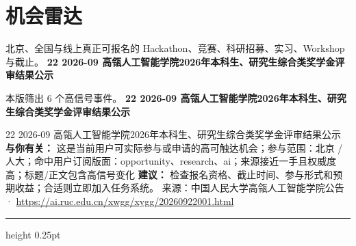 \documentclass[10.5pt]{ctexart}
\begin{document}
\section*{机会雷达}
{\color{ormuted} 北京、全国与线上真正可报名的 Hackathon、竞赛、科研招募、实习、Workshop 与截止。}
\vspace{2mm}
{\LARGE\bfseries 22 2026-09 高瓴人工智能学院2026年本科生、研究生综合类奖学金评审结果公示}\par
\vspace{1mm}
{\color{ormuted} 本版筛出 6 个高信号事件。}
\vspace{3mm}
{\Large\bfseries 22 2026-09 高瓴人工智能学院2026年本科生、研究生综合类奖学金评审结果公示}\par
22 2026-09 高瓴人工智能学院2026年本科生、研究生综合类奖学金评审结果公示
\textbf{与你有关：} 这是当前用户可实际参与或申请的高可触达机会；参与范围：北京 / 人大；命中用户订阅版面：opportunity、research、ai；来源接近一手且权威度高；标题/正文包含高信号变化
\textbf{建议：} 检查报名资格、截止时间、参与形式和预期收益；合适则立即加入任务系统。
{\footnotesize\color{ormuted} 来源：中国人民大学高瓴人工智能学院公告 · \url{https://ai.ruc.edu.cn/xwgg/xygg/20260922001.html}}
\vspace{4mm}
\hrule height 0.25pt
\vspace{3mm}
\end{document}
